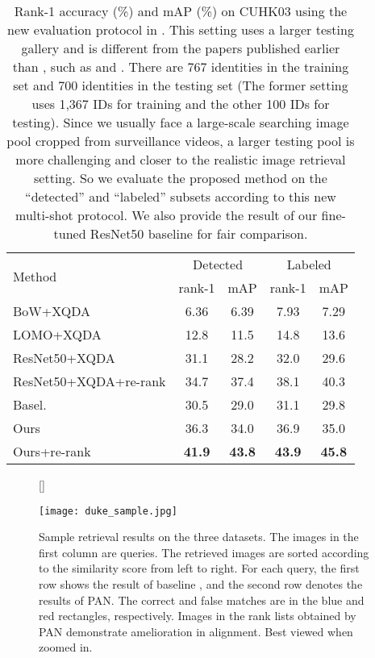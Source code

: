 \setlength{\tabcolsep}{15pt}
\begin{table*}
\begin{center}
\begin{tabular}{l|cc|cc}
\hline
\multirow{2}{*}{Method} & \multicolumn{2}{c|}{Detected} & \multicolumn{2}{c}{Labeled}\\
& rank-1 & mAP & rank-1  & mAP \\
\hline
BoW+XQDA \cite{zheng2015scalable} & 6.36 & 6.39 & 7.93 &7.29 \\
LOMO+XQDA \cite{liao2015person} & 12.8 & 11.5 & 14.8 & 13.6\\
ResNet50+XQDA \cite{zhong2017re} & 31.1 & 28.2 & 32.0 & 29.6\\
ResNet50+XQDA+re-rank \cite{zhong2017re} & 34.7 & 37.4 & 38.1 & 40.3\\
\hline
Basel. & 30.5 & 29.0 & 31.1& 29.8\\
Ours & 36.3 & 34.0 & 36.9 & 35.0 \\
Ours+re-rank & \textbf{41.9} & \textbf{43.8} & \textbf{43.9} & \textbf{45.8} \\
\hline
\end{tabular}
\end{center}
\caption{Rank-1 accuracy (\%) and mAP (\%) on CUHK03 using the new evaluation protocol in \cite{zhong2017re}. This setting uses a larger testing gallery and is different from the papers published earlier than \cite{zhong2017re}, such as \cite{liu2016end} and \cite{varior2016siamese}. There are 767 identities in the training set and 700 identities in the testing set (The former setting uses 1,367 IDs for training and the other 100 IDs for testing). Since we usually face a large-scale searching image pool cropped from surveillance videos, a larger testing pool is more challenging and closer to the realistic image retrieval setting. So we evaluate the proposed method on the ``detected'' and ``labeled'' subsets according to this new multi-shot protocol. We also provide the result of our fine-tuned ResNet50 baseline for fair comparison.}
\label{table:cuhk}
\end{table*}

\begin{figure*}
[\FBwidth]
{\caption{Sample retrieval results on the three datasets. The images in the first column are queries. The retrieved images are sorted according to the similarity score from left to right. For each query, the first row shows the result of baseline \cite{zheng2016survey}, and the second row denotes the results of PAN. The correct and false matches are in the blue and red rectangles, respectively. Images in the rank lists obtained by PAN demonstrate amelioration in alignment. Best viewed when zoomed in.}\label{fig:duke}}
{\texttt{[image: duke\_sample.jpg]}}
\end{figure*}

